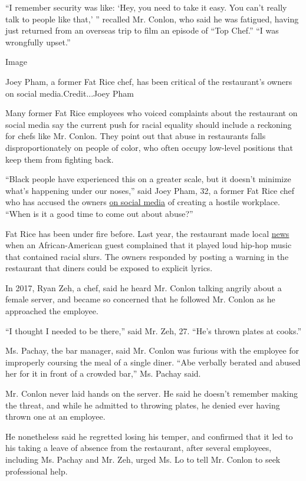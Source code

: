 ``I remember security was like: `Hey, you need to take it easy. You
can't really talk to people like that,' '' recalled Mr. Conlon, who said
he was fatigued, having just returned from an overseas trip to film an
episode of ``Top Chef.'' ``I was wrongfully upset.''

Image

Joey Pham, a former Fat Rice chef, has been critical of the restaurant's
owners on social media.Credit...Joey Pham

Many former Fat Rice employees who voiced complaints about the
restaurant on social media say the current push for racial equality
should include a reckoning for chefs like Mr. Conlon. They point out
that abuse in restaurants falls disproportionately on people of color,
who often occupy low-level positions that keep them from fighting back.

``Black people have experienced this on a greater scale, but it doesn't
minimize what's happening under our noses,'' said Joey Pham, 32, a
former Fat Rice chef who has accused the owners
\href{https://www.instagram.com/flavorsupreme/}{on social media} of
creating a hostile workplace. ``When is it a good time to come out about
abuse?''

Fat Rice has been under fire before. Last year, the restaurant made
local
\href{https://chicago.eater.com/2019/2/14/18202640/chicago-restaurants-music-hip-hop-n-word-playlist-explicit-lyrics-fat-rice-furious-spoon-no-bones}{news}
when an African-American guest complained that it played loud hip-hop
music that contained racial slurs. The owners responded by posting a
warning in the restaurant that diners could be exposed to explicit
lyrics.

In 2017, Ryan Zeh, a chef, said he heard Mr. Conlon talking angrily
about a female server, and became so concerned that he followed Mr.
Conlon as he approached the employee.

``I thought I needed to be there,'' said Mr. Zeh, 27. ``He's thrown
plates at cooks.''

Ms. Pachay, the bar manager, said Mr. Conlon was furious with the
employee for improperly coursing the meal of a single diner. ``Abe
verbally berated and abused her for it in front of a crowded bar,'' Ms.
Pachay said.

Mr. Conlon never laid hands on the server. He said he doesn't remember
making the threat, and while he admitted to throwing plates, he denied
ever having thrown one at an employee.

He nonetheless said he regretted losing his temper, and confirmed that
it led to his taking a leave of absence from the restaurant, after
several employees, including Ms. Pachay and Mr. Zeh, urged Ms. Lo to
tell Mr. Conlon to seek professional help.

